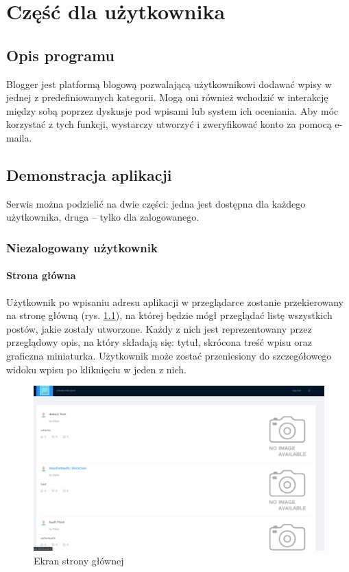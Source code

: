 \documentclass[declaration,shortabstract]{iithesis}
\begin{document}
\chapter{Część dla użytkownika}
\section{Opis programu}
Blogger jest platformą blogową pozwalającą użytkownikowi dodawać wpisy w jednej z predefiniowanych kategorii. Mogą oni również wchodzić w interakcję między sobą poprzez dyskusje pod wpisami lub system ich oceniania. Aby móc korzystać z tych funkcji, wystarczy utworzyć i zweryfikować konto za pomocą e-maila.
\section{Demonstracja aplikacji}
Serwis można podzielić na dwie części: jedna jest dostępna dla każdego użytkownika, druga – tylko dla zalogowanego.
\subsection{Niezalogowany użytkownik}
\subsubsection{Strona główna}
Użytkownik po wpisaniu adresu aplikacji w przeglądarce zostanie przekierowany na stronę główną (rys. \ref{fig:main_page}), na której będzie mógł przeglądać listę wszystkich postów, jakie zostały utworzone. Każdy z nich jest reprezentowany przez przeglądowy opis, na który składają się: tytuł, skrócona treść wpisu oraz graficzna miniaturka. Użytkownik może zostać przeniesiony do szczegółowego widoku wpisu po kliknięciu w jeden z nich.

\begin{figure}
    \centering
    \includegraphics[width=\textwidth]{images/stronaglowna.png}
    \caption{Ekran strony głównej}
    \label{fig:main_page}
\end{figure}
\end{document}
